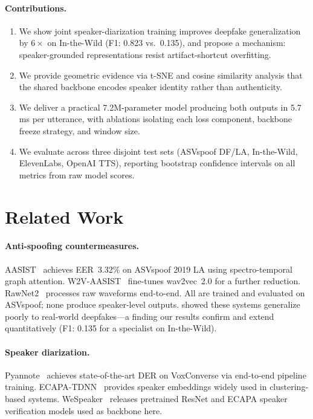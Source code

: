 \documentclass{article}
\begin{document}
\paragraph{Contributions.}
\begin{enumerate}
  \item We show joint speaker-diarization training improves deepfake
        generalization by $6\times$ on In-the-Wild (F1: 0.823 vs.\ 0.135),
        and propose a mechanism: speaker-grounded representations resist
        artifact-shortcut overfitting.
  \item We provide geometric evidence via t-SNE and cosine similarity analysis
        that the shared backbone encodes speaker identity rather than authenticity.
  \item We deliver a practical 7.2M-parameter model producing both outputs in
        5.7\,ms per utterance, with ablations isolating each loss component,
        backbone freeze strategy, and window size.
  \item We evaluate across three disjoint test sets (ASVspoof DF/LA,
        In-the-Wild, ElevenLabs, OpenAI TTS), reporting bootstrap confidence intervals
        on all metrics from raw model scores.
\end{enumerate}

\section{Related Work}

\paragraph{Anti-spoofing countermeasures.}
AASIST~\citep{jung2022aasist} achieves EER~3.32\% on ASVspoof 2019 LA using
spectro-temporal graph attention. W2V-AASIST~\citep{tak2022w2vaasist} fine-tunes
wav2vec~2.0 for a further reduction. RawNet2~\citep{jung2022rawnet2} processes
raw waveforms end-to-end. All are trained and evaluated on ASVspoof; none
produce speaker-level outputs. \citet{muller2022interspeech} showed these
systems generalize poorly to real-world deepfakes---a finding our results
confirm and extend quantitatively (F1: 0.135 for a specialist on In-the-Wild).

\paragraph{Speaker diarization.}
Pyannote~\citep{bredin2020pyannote,plaquet2023powerset} achieves
state-of-the-art DER on VoxConverse via end-to-end pipeline training.
ECAPA-TDNN~\citep{desplanques2020ecapa} provides speaker embeddings widely
used in clustering-based systems. WeSpeaker~\citep{wang2023wespeaker} releases
pretrained ResNet and ECAPA speaker verification models used as backbone here.
\end{document}
